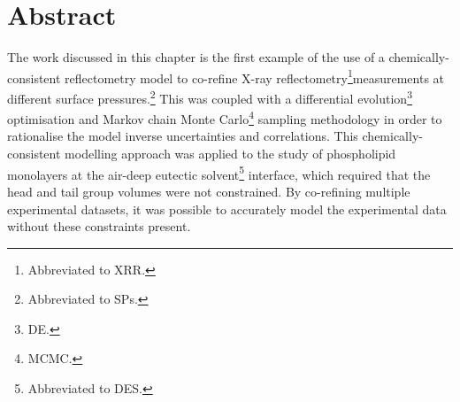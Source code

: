 \section*{Abstract}
The work discussed in this chapter is the first example of the use of a chemically-consistent reflectometry model to co-refine X-ray reflectometry\footnote{Abbreviated to XRR.}measurements at different surface pressures.\footnote{Abbreviated to SPs.}
This was coupled with a differential evolution\footnote{DE.} optimisation and Markov chain Monte Carlo\footnote{MCMC.} sampling methodology in order to rationalise the model inverse uncertainties and correlations.
This chemically-consistent modelling approach was applied to the study of phospholipid monolayers at the air-deep eutectic solvent\footnote{Abbreviated to DES.} interface, which required that the head and tail group volumes were not constrained.
By co-refining multiple experimental datasets, it was possible to accurately model the experimental data without these constraints present.
